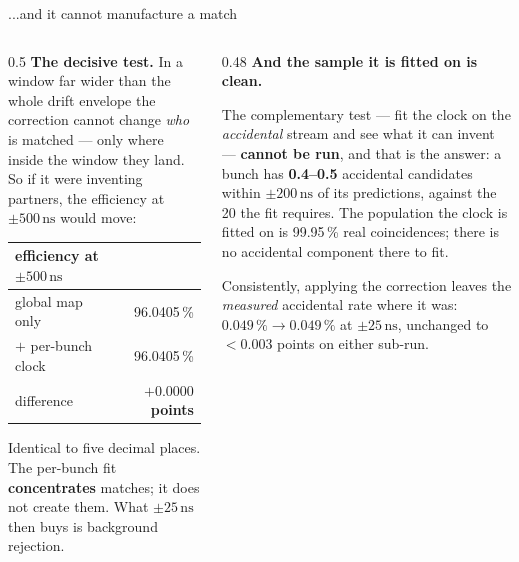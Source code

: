 \documentclass[aspectratio=169,10pt]{beamer}
\newcommand{\ns}{\,\mathrm{ns}}
\newcommand{\hl}[1]{\textcolor{orange!75!black}{\textbf{#1}}}
\newcommand{\gd}[1]{\textcolor{green!35!black}{\textbf{#1}}}
\begin{document}
\begin{frame}{...and it cannot manufacture a match}
\begin{columns}[T]
\begin{column}{0.5\textwidth}
\textbf{The decisive test.} In a window far wider than the whole drift envelope
the correction cannot change \emph{who} is matched --- only where inside the
window they land. So if it were inventing partners, the efficiency at
$\pm500\ns$ would move:
\vspace{0.4em}

\small
\begin{tabular}{lr}
\toprule
efficiency at $\pm500\ns$ & \\
\midrule
global map only            & 96.0405\,\%\\
$+$ per-bunch clock        & 96.0405\,\%\\
\midrule
difference                 & \gd{$+0.0000$ points}\\
\bottomrule
\end{tabular}
\normalsize
\vspace{0.5em}

Identical to five decimal places. The per-bunch fit \hl{concentrates} matches;
it does not create them. What $\pm25\ns$ then buys is background rejection.
\end{column}
\begin{column}{0.48\textwidth}
\textbf{And the sample it is fitted on is clean.}
\vspace{0.4em}

The complementary test --- fit the clock on the \emph{accidental} stream and see
what it can invent --- \textbf{cannot be run}, and that is the answer: a bunch
has \hl{0.4--0.5} accidental candidates within $\pm200\ns$ of its predictions,
against the 20 the fit requires. The population the clock is fitted on is
99.95\,\% real coincidences; there is no accidental component there to fit.
\vspace{0.6em}

Consistently, applying the correction leaves the \emph{measured} accidental rate
where it was: $0.049\,\% \to 0.049\,\%$ at $\pm25\ns$, unchanged to $<0.003$
points on either sub-run.
\end{column}
\end{columns}
\end{frame}
\end{document}
